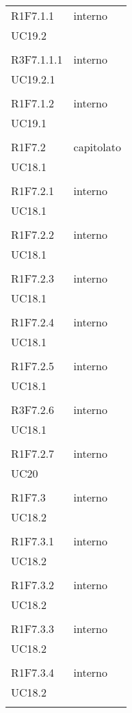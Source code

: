 \begin{longtable}{ >{\centering}p{}
		>{\centering}p{}}
	R1F7.1.1 & interno\\UC19.2\\\tabularnewline
	
	R3F7.1.1.1 & interno\\UC19.2.1\\\tabularnewline
	
	R1F7.1.2 & interno\\UC19.1\\\tabularnewline
	
	R1F7.2 & capitolato\\UC18.1\\\tabularnewline
	
	R1F7.2.1 & interno\\UC18.1\\\tabularnewline
	
	R1F7.2.2 & interno\\UC18.1\\\tabularnewline
	
	R1F7.2.3 & interno\\UC18.1\\\tabularnewline
	
	R1F7.2.4 & interno\\UC18.1\\\tabularnewline
	
	R1F7.2.5 & interno\\UC18.1\\\tabularnewline
	
	R3F7.2.6 & interno\\UC18.1\\\tabularnewline
	
	R1F7.2.7 & interno\\UC20\\\tabularnewline
	
	R1F7.3 & interno\\UC18.2\\\tabularnewline
	
	R1F7.3.1 & interno\\UC18.2\\\tabularnewline
	
	R1F7.3.2 & interno\\UC18.2\\\tabularnewline
	
	R1F7.3.3 & interno\\UC18.2\\\tabularnewline
	
	R1F7.3.4 & interno\\UC18.2\\\tabularnewline
	

\end{longtable}
